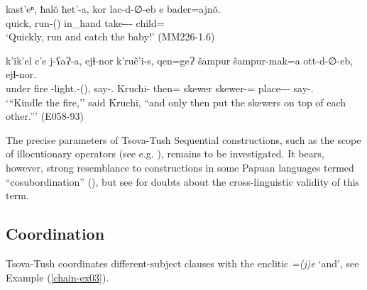 \begin{exe}
	\ex\label{chain-ex07}
	\begin{xlist}
		
		
			\ex\label{chain-ex07a}
			\gll kast'eⁿ, ħal\u{o} ħet'-a, kor lac-d-∅-eb e bader=ajn\u{o}. \\
			quick, {\Pv} run-{\Imp}(\Seq) in\_hand take-{\D}-{\Tr}-{\Imp} {\Prox} child={\Quot} \\
			\trans `Quickly, run and catch the baby!'
			\hfill (MM226-1.6)
		
		
		
			\ex\label{chain-ex07b}
			\gll k'ik'el c'e j-ʕaɁ-a, ejɬ-nor k'ruč'i-s, qen=geɁ šampur šampur-mak=a ott-d-∅-eb, ejɬ-nor.\\
			under fire {\J}-light.{\Pfv}-{\Imp}({\Seq}), say-{\Nw}.{\Rem} Kruchi-{\Erg} then={\Emph} skewer skewer-{\Superlat}={\Add} place-{\D}-{\Tr}-{\Imp} say-{\Nw}.{\Rem} \\
			\trans `{``}Kindle the fire,'' said Kruchi, ``and only then put the skewers on top of each other.{''}'
			\hfill (E058-93)
		
		
	\end{xlist}
\end{exe}


The precise parameters of Tsova-Tush Sequential constructions, such as the scope of illocutionary
operators (see e.g. \cite[56]{bickel2010clauselink}), remains to be investigated. It bears, however, strong resemblance to constructions in some Papuan languages termed ``cosubordination'' (\cite{olson81clauserelation,foleyvanvalin84}), but see \textcite{bickel2010clauselink,foley2010clauselink} for doubts about the cross-linguistic validity of this term.

\subsection{Coordination}\largerpage

Tsova-Tush coordinates different-subject clauses with the enclitic \textit{=(j)e} `and', see Example (\ref{chain-ex03}).



